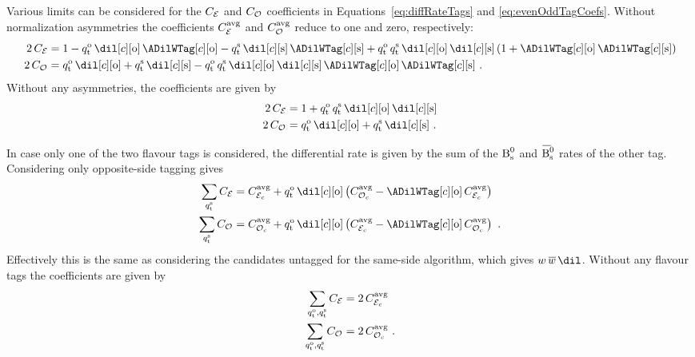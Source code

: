Various limits can be considered for the $\CEven$ and $\COdd$ coefficients in Equations~\ref{eq:diffRateTags} and \ref{eq:evenOddTagCoefs}.
Without \BsBsbar{} normalization asymmetries the coefficients $\avgCEven$ and $\avgCOdd$ reduce to one and zero, respectively:
\begin{subequations}
  \begin{align}
    2\,\CEven &= 1
                 - \qtOS\,\dilOS[c]\,\ADilWTagOS[c]
                 - \qtSS\,\dilSS[c]\,\ADilWTagSS[c]
                 + \qtOS\,\qtSS\,\dilOS[c]\,\dilSS[c]\,(1 + \ADilWTagOS[c]\,\ADilWTagSS[c]) \\
    2\,\COdd &=  \qtOS\,\dilOS[c]
                 + \qtSS\,\dilSS[c]
                 - \qtOS\,\qtSS\,\dilOS[c]\,\dilSS[c]\,\ADilWTagOS[c]\,\ADilWTagSS[c] \ .
  \end{align}
\end{subequations}
Without any asymmetries, the coefficients are given by
\begin{subequations}
  \label{eq:evenOddTagCoefsNoAsym}
  \begin{align}
    2\,\CEven &= 1
                 + \qtOS\,\qtSS\,\dilOS[c]\,\dilSS[c] \\
    2\,\COdd &=  \qtOS\,\dilOS[c]
                 + \qtSS\,\dilSS[c] \ .
  \end{align}
\end{subequations}

In case only one of the two flavour tags is considered, the differential rate is given by the sum of the $\Bs$ and $\Bsbar$ rates of the
other tag. Considering only opposite-side tagging gives
\begin{subequations}
  \label{eq:evenOddTagCoefsOneTag}
  \begin{align}
    \sum_{\qtSS} \CEven &= \avgCEven[c] + \qtOS\,\dilOS[c]\left(\avgCOdd[c]  - \ADilWTagOS[c]\,\avgCEven[c] \right) \\
    \sum_{\qtSS} \COdd  &= \avgCOdd[c]  + \qtOS\,\dilOS[c]\left(\avgCEven[c] - \ADilWTagOS[c]\,\avgCOdd[c]  \right) \ .
  \end{align}
\end{subequations}
Effectively this is the same as considering the candidates untagged for the same-side algorithm, which gives
$\wTag$\textequiv$\wTagBar$\textto$\dil$. Without any flavour tags the coefficients are given by
\begin{subequations}
  \label{eq:evenOddTagCoefsNoTags}
  \begin{align}
    \sum_{\qtOS,\qtSS} \CEven &= 2\,\avgCEven[c] \\
    \sum_{\qtOS,\qtSS} \COdd  &= 2\,\avgCOdd[c]  \ .
  \end{align}
\end{subequations}


